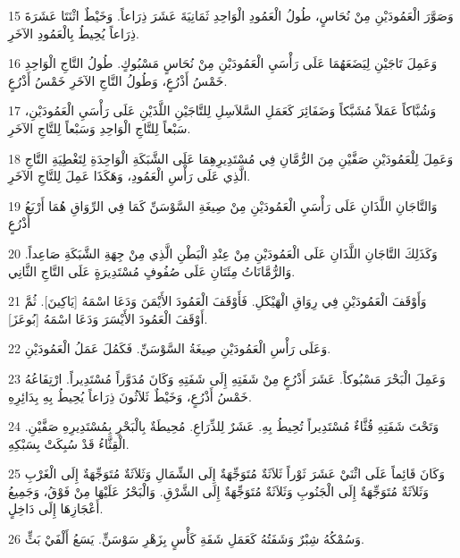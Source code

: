 \par 15 وَصَوَّرَ الْعَمُودَيْنِ مِنْ نُحَاسٍ، طُولُ الْعَمُودِ الْوَاحِدِ ثَمَانِيَةَ عَشَرَ ذِرَاعاً. وَخَيْطٌ اثْنَتَا عَشَرَةَ ذِرَاعاً يُحِيطُ بِالْعَمُودِ الآخَرِ.
\par 16 وَعَمِلَ تَاجَيْنِ لِيَضَعَهُمَا عَلَى رَأْسَيِ الْعَمُودَيْنِ مِنْ نُحَاسٍ مَسْبُوكٍ. طُولُ التَّاجِ الْوَاحِدِ خَمْسُ أَذْرُعٍ، وَطُولُ التَّاجِ الآخَرِ خَمْسُ أَذْرُعٍ.
\par 17 وَشُبَّاكاً عَمَلاً مُشَبَّكاً وَضَفَائِرَ كَعَمَلِ السَّلاَسِلِ لِلتَّاجَيْنِ اللَّذَيْنِ عَلَى رَأْسَيِ الْعَمُودَيْنِ، سَبْعاً لِلتَّاجِ الْوَاحِدِ وَسَبْعاً لِلتَّاجِ الآخَرِ.
\par 18 وَعَمِلَ لِلْعَمُودَيْنِ صَفَّيْنِ مِنَ الرُّمَّانِ فِي مُسْتَدِيرِهِمَا عَلَى الشَّبَكَةِ الْوَاحِدَةِ لِتَغْطِيَةِ التَّاجِ الَّذِي عَلَى رَأْسِ الْعَمُودِ، وَهَكَذَا عَمِلَ لِلتَّاجِ الآخَرِ.
\par 19 وَالتَّاجَانِ اللَّذَانِ عَلَى رَأْسَيِ الْعَمُودَيْنِ مِنْ صِيغَةِ السَّوْسَنِّ كَمَا فِي الرِّوَاقِ هُمَا أَرْبَعُ أَذْرُعٍ
\par 20 وَكَذَلِكَ التَّاجَانِ اللَّذَانِ عَلَى الْعَمُودَيْنِ مِنْ عِنْدِ الْبَطْنِ الَّذِي مِنْ جِهَةِ الشَّبَكَةِ صَاعِداً. وَالرُّمَّانَاتُ مِئَتَانِ عَلَى صُفُوفٍ مُسْتَدِيرَةٍ عَلَى التَّاجِ الثَّانِي.
\par 21 وَأَوْقَفَ الْعَمُودَيْنِ فِي رِوَاقِ الْهَيْكَلِ. فَأَوْقَفَ الْعَمُودَ الأَيْمَنَ وَدَعَا اسْمَهُ [يَاكِينَ]. ثُمَّ أَوْقَفَ الْعَمُودَ الأَيْسَرَ وَدَعَا اسْمَهُ [بُوعَزَ].
\par 22 وَعَلَى رَأْسِ الْعَمُودَيْنِ صِيغَةُ السَّوْسَنِّ. فَكَمُلَ عَمَلُ الْعَمُودَيْنِ.
\par 23 وَعَمِلَ الْبَحْرَ مَسْبُوكاً. عَشَرَ أَذْرُعٍ مِنْ شَفَتِهِ إِلَى شَفَتِهِ وَكَانَ مُدَوَّراً مُسْتَدِيراً. ارْتِفَاعُهُ خَمْسُ أَذْرُعٍ، وَخَيْطٌ ثَلاَثُونَ ذِرَاعاً يُحِيطُ بِهِ بِدَائِرِهِ.
\par 24 وَتَحْتَ شَفَتِهِ قُثَّاءٌ مُسْتَدِيراً تُحِيطُ بِهِ. عَشَرٌ لِلذِّرَاعِ. مُحِيطَةٌ بِالْبَحْرِ بِمُسْتَدِيرِهِ صَفَّيْنِ. الْقِثَّاءُ قَدْ سُبِكَتْ بِسَبْكِهِ.
\par 25 وَكَانَ قَائِماً عَلَى اثْنَيْ عَشَرَ ثَوْراً ثَلاَثَةٌ مُتَوَجِّهَةٌ إِلَى الشِّمَالِ وَثَلاَثَةٌ مُتَوَجِّهَةٌ إِلَى الْغَرْبِ وَثَلاَثَةٌ مُتَوَجِّهَةٌ إِلَى الْجَنُوبِ وَثَلاَثَةٌ مُتَوَجِّهَةٌ إِلَى الشَّرْقِ. وَالْبَحْرُ عَلَيْهَا مِنْ فَوْقُ، وَجَمِيعُ أَعْجَازِهَا إِلَى دَاخِلٍ.
\par 26 وَسُمْكُهُ شِبْرٌ وَشَفَتُهُ كَعَمَلِ شَفَةِ كَأْسٍ بِزَهْرِ سَوْسَنٍّ. يَسَعُ أَلْفَيْ بَثٍّ.
